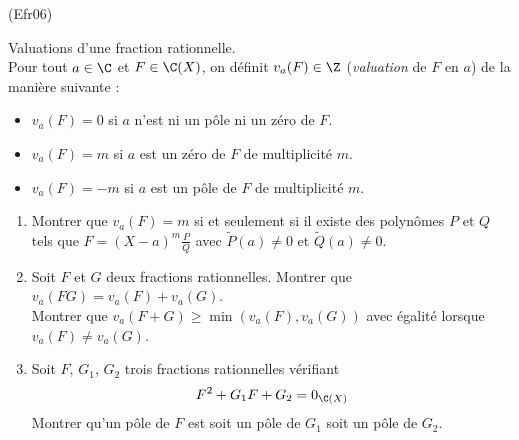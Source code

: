 \begin{tiny}(Efr06)\end{tiny} Valuations d'une fraction rationnelle.\\
Pour tout $a\in \C$ et $F\in \C(X)$, on définit $v_a(F)\in\Z$ (\emph{valuation} de $F$ en $a$) de la manière suivante :
\begin{itemize}
 \item $v_a(F)=0$ si $a$ n'est ni un pôle ni un zéro de $F$.
 \item $v_a(F)=m$ si $a$ est un zéro de $F$ de multiplicité $m$.
 \item $v_a(F)=-m$ si $a$ est un pôle de $F$ de multiplicité $m$.
\end{itemize}
\begin{enumerate}
 \item Montrer que $v_a(F)=m$ si et seulement si il existe des polynômes $P$ et $Q$ tels que $F=(X-a)^m\frac{P}{Q}$ avec $\widetilde{P}(a)\neq0$ et $\widetilde{Q}(a)\neq0$.
 \item Soit $F$ et $G$ deux fractions rationnelles. Montrer que $v_a(FG)=v_a(F)+v_a(G)$.\\ Montrer que $v_a(F+G)\geq \min(v_a(F),v_a(G))$ avec égalité lorsque $v_a(F)\neq v_a(G)$.
 \item Soit $F$, $G_1$, $G_2$ trois fractions rationnelles vérifiant
\begin{displaymath}
 F^2 + G_1F+G_2 = 0_{\C(X)}
\end{displaymath}
Montrer qu'un pôle de $F$ est soit un pôle de $G_1$ soit un pôle de $G_2$.
\end{enumerate}

 